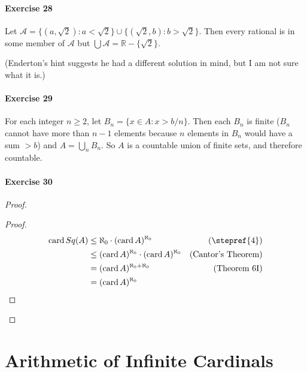 \documentclass{report}
\newcommand{\card}{\ensuremath{\operatorname{card}}}
\begin{document}
    \paragraph{Exercise 28}
    Let $\mathcal{A} = \{ (a, \sqrt{2}) : a < \sqrt{2} \} \cup \{ (\sqrt{2}, b) : b > \sqrt{2} \}$.
    Then every rational is in some member of $\mathcal{A}$ but $\bigcup \mathcal{A} = \mathbb{R} - \{ \sqrt{2} \}$.

    (Enderton's hint suggests he had a different solution in mind, but I am not sure what it is.)

    \paragraph{Exercise 29}
    For each integer $n \geq 2$, let $B_n = \{ x \in A : x > b / n \}$. Then each $B_n$ is finite ($B_n$ cannot
    have more than $n - 1$ elements because $n$ elements in $B_n$ would have a sum $> b$) and $A =
    \bigcup_n B_n$. So $A$ is a countable union of finite sets, and therefore countable.

    \paragraph{Exercise 30}
    \begin{proof}
        \pf
        \step{5}{$\card Sq(A) \leq (\card A)^{\aleph_0}$}
        \begin{proof}
            \pf
            \begin{align*}
                \card Sq(A) & \leq \aleph_0 \cdot (\card A)^{\aleph_0} & (\text{\stepref{4}})\\
                & \leq (\card A)^{\aleph_0} \cdot (\card A)^{\aleph_0} & (\text{Cantor's Theorem})\\
                & = (\card A)^{\aleph_0 + \aleph_0} & (\text{Theorem 6I})\\
                & = (\card A)^{\aleph_0} & 
            \end{align*}
        \end{proof}
    \end{proof}

    \section{Arithmetic of Infinite Cardinals}
\end{document}
